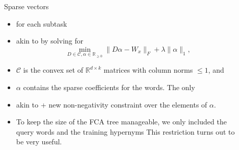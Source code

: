 \documentclass{beamer}
\newlength{\sepwid}
\newlength{\onecolwid}
\newlength{\twocolwid}
\begin{document}
\begin{frame}[t]
\begin{columns}[t]
\begin{column}{\onecolwid}
\end{column}

\begin{column}{\sepwid} %
\end{column}   

  \begin{column}{\onecolwid}

    \begin{block}{Sparse vectors}
      \begin{itemize}
        \item for each subtask 
        \item akin to \citet{Berend:2017} by solving for
          \begin{equation}
            \min\limits_{D \in \mathcal{C}, \alpha \in \mathbb{R}_{\geq0}} \lVert D\alpha - W_{x} \rVert_F + \lambda \lVert \alpha \rVert_1,
            \label{nonneg_SPAMS_objective}
          \end{equation}
        \item $\mathcal{C}$ is the convex set of $\mathbb{R}^{ d \times k}$
          matrices with column norms $\le 1$, and 
        \item $\alpha$ contains the sparse coefficients for the words. The only 
        \item akin to \citet{Berend:2017} + new non-negativity constraint over the
          elements of $\alpha$.
        \item To keep the size of the FCA tree manageable, we only included the
          query words and the training hypernyms This restriction turns out to be
          very useful.
      \end{itemize}
    \end{block}


\end{column}
\end{columns}
\end{frame}
\end{document}
